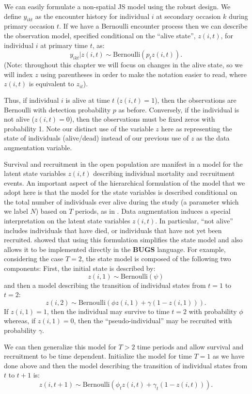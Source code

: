 We can easily formulate
 a non-spatial JS
model using the robust design. We 
define $y_{ikt}$ as the encounter history for individual
$i$ at secondary occasion $k$ during primary occasion $t$.  If we have
a Bernoulli encounter process then we can describe the observation
model, specified conditional on the ``alive state'', $z(i,t)$, for
individual $i$ at primary time $t$, as:
 \[
  y_{ikt}|z(i,t) \sim
\mbox{Bernoulli}(p_t z(i,t)).
\]
(Note: throughout this chapter we will focus on changes in the 
alive state, so we will index $z$ using parentheses in order to make the notation easier to read,
where $z(i,t)$ is equivalent to $z_{it}$).

Thus, if individual $i$ is alive at time $t$ ($z(i,t)=1$), then the
observations are Bernoulli with detection probability $p$ as before.  Conversely, if the individual is
not alive ($z(i,t)=0$), then the observations must be fixed zeros with
probability 1. Note our distinct use of the variable $z$ here as
representing the state of individuals (alive/dead) instead of our
previous use of $z$ as the data augmentation variable. 

Survival and recruitment in the open population are manifest in a
model for the latent state variables $z(i,t)$ describing individual
mortality and recruitment events.  An important aspect of the
hierarchical formulation of the model that we adopt here is that the
model for the state variables is described conditional on the total
number of individuals ever alive during the study (a parameter which
we label $N$) based on $T$ periods, as in \citet{schwarz_arnason:1996}.  Data
augmentation induces a special interpretation on the latent state
variables $z(i,t)$.
In particular, ``not alive'' includes individuals
that have died, or individuals that have not yet been recruited.
\citet{royle_dorazio:2008} showed that using this formulation
simplifies the state model and also allows it
to be implemented directly in the \textbf{BUGS} language.
For example, considering the case $T=2$, the state model is composed
of the following two components: First, the initial state is described
by:
\[
 z(i,1) \sim \mbox{Bernoulli}(\psi)
\]
and then a model describing the transition of individual states from
$t=1$ to $t=2$:
\[
 z(i,2) \sim \mbox{Bernoulli}( \phi z(i,1)  + \gamma (1-z(i,1)) ).
\]
If $z(i,1)=1$, then the individual may survive to time $t=2$ with
probability $\phi$ whereas, if $z(i,1)=0$, then the
``pseudo-individual'' may be recruited with probability $\gamma$.

We can then generalize this model for $T>2$ time periods and allow survival and
recruitment to be time dependent.  Initialize the
model for time $T=1$ as we have done above
and then the model describing the transition of individual states from
$t$ to $t+1$ is:
\[
 z(i,t+1) \sim \mbox{Bernoulli}( \phi_t z(i,t)  + \gamma_t (1-z(i,t)) ).
\]


